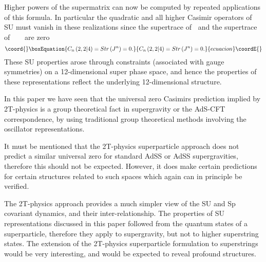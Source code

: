 \documentclass[a4paper,aps,preprint,nofootinbib]{revtex4}
\begin{document}
Higher powers of the supermatrix \coordHE{} can now be
computed by repeated applications of this formula. In particular
the quadratic and all higher Casimir operators of SU\coordHE{} must vanish in these realizations
since the supertrace of \coordHE{}\textbf{\ }and the supertrace of\textbf{%
\ \ }\coordHE{}\textbf{\ }are zero
\begin{equation}\coord{}\boxEquation{
C_{n}\left( 2,2|4\right) =Str\left( J^{n}\right) =0.  \label{Cn}
}{
C_{n}\left( 2,2|4\right) =Str\left( J^{n}\right) =0.  }{ecuacion}\coordE{}\end{equation}%
These SU\coordHE{} properties arose through constraints
(associated with gauge symmetries) on a 12-dimensional super phase space,
and hence the properties of these representations reflect the underlying
12-dimensional structure.

In this paper we have seen that the universal zero Casimirs
prediction implied by 2T-physics \cite{AdS5S5} is a group
theoretical fact in supergravity or the AdS-CFT correspondence, by
using traditional group theoretical methods involving the
oscillator representations.

It must be mentioned that the 2T-physics superparticle approach
does not predict a similar universal zero for standard
AdS\myHighlight{$_4\times$}\coordHE{}S\coordHE{} or AdS\myHighlight{$_7\times$}\coordHE{}S\coordHE{} supergravities, therefore
this should not be expected. However, it does make certain
predictions \cite{AdS5S5} for certain structures related to such
spaces which again can in principle be verified.

The 2T-physics approach provides a much simpler view of the SU\coordHE{} and Sp\myHighlight{$\left( 2\right) $}\coordHE{} covariant dynamics, and their
inter-relationship. The properties of SU\coordHE{}
representations discussed in this paper followed from the quantum states of
a superparticle, therefore they apply to supergravity, but not to higher
superstring states. The extension of the 2T-physics superparticle
formulation to superstrings would be very interesting, and would be expected
to reveal profound structures.
\end{document}
